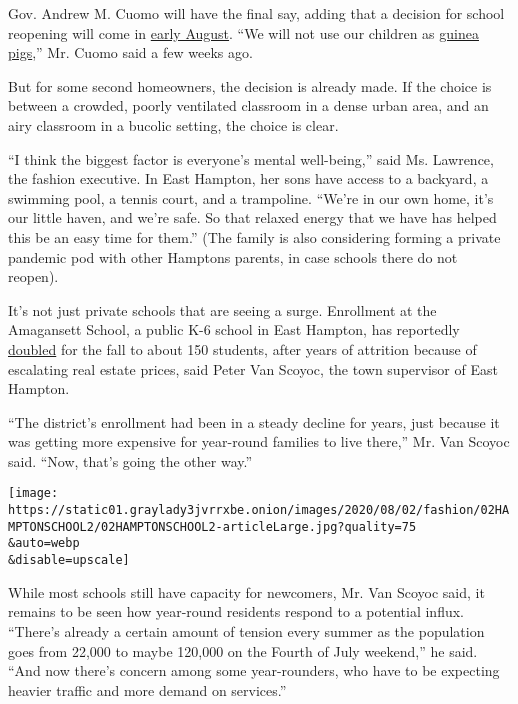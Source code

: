 Gov. Andrew M. Cuomo will have the final say, adding that a decision for
school reopening will come in
\href{https://www.nbcnewyork.com/news/coronavirus/nyc-to-ask-state-for-extension-on-specific-back-to-school-plans/2540164/}{early
August}. ``We will not use our children as
\href{https://www.cnbc.com/video/2020/07/13/new-york-gov-cuomo-on-reopening-schools-were-not-going-to-use-our-children-as-guinea-pigs.html}{guinea
pigs},'' Mr. Cuomo said a few weeks ago.

But for some second homeowners, the decision is already made. If the
choice is between a crowded, poorly ventilated classroom in a dense
urban area, and an airy classroom in a bucolic setting, the choice is
clear.

``I think the biggest factor is everyone's mental well-being,'' said Ms.
Lawrence, the fashion executive. In East Hampton, her sons have access
to a backyard, a swimming pool, a tennis court, and a trampoline.
``We're in our own home, it's our little haven, and we're safe. So that
relaxed energy that we have has helped this be an easy time for them.''
(The family is also considering forming a private pandemic pod with
other Hamptons parents, in case schools there do not reopen).

It's not just private schools that are seeing a surge. Enrollment at the
Amagansett School, a public K-6 school in East Hampton, has reportedly
\href{https://www.easthamptonstar.com/education/2020716/amagansett-school-expects-enrollment-to-double}{doubled}
for the fall to about 150 students, after years of attrition because of
escalating real estate prices, said Peter Van Scoyoc, the town
supervisor of East Hampton.

``The district's enrollment had been in a steady decline for years, just
because it was getting more expensive for year-round families to live
there,'' Mr. Van Scoyoc said. ``Now, that's going the other way.''

\texttt{[image: https://static01.graylady3jvrrxbe.onion/images/2020/08/02/fashion/02HAMPTONSCHOOL2/02HAMPTONSCHOOL2-articleLarge.jpg?quality=75\\\&auto=webp\\\&disable=upscale]}

While most schools still have capacity for newcomers, Mr. Van Scoyoc
said, it remains to be seen how year-round residents respond to a
potential influx. ``There's already a certain amount of tension every
summer as the population goes from 22,000 to maybe 120,000 on the Fourth
of July weekend,'' he said. ``And now there's concern among some
year-rounders, who have to be expecting heavier traffic and more demand
on services.''

